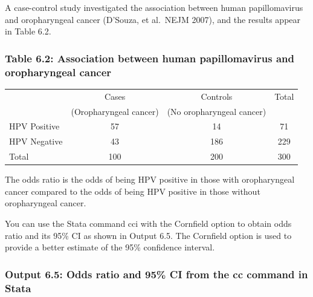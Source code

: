 \documentclass[
]{memoir}
\begin{document}
A case-control study investigated the association between human papillomavirus and oropharyngeal cancer (D'Souza, et al.~NEJM 2007), and the results appear in Table 6.2.

\hypertarget{table-6.2-association-between-human-papillomavirus-and-oropharyngeal-cancer}{%
\subsubsection{Table 6.2: Association between human papillomavirus and oropharyngeal cancer}\label{table-6.2-association-between-human-papillomavirus-and-oropharyngeal-cancer}}

\begin{longtable}[]{@{}lccc@{}}
\toprule
\endhead
& Cases & Controls & Total \\
& (Oropharyngeal cancer) & (No oropharyngeal cancer) & \\
HPV Positive & 57 & 14 & 71 \\
HPV Negative & 43 & 186 & 229 \\
Total & 100 & 200 & 300 \\
\bottomrule
\end{longtable}

The odds ratio is the odds of being HPV positive in those with oropharyngeal cancer compared to the odds of being HPV positive in those without oropharyngeal cancer.

You can use the Stata command cci with the Cornfield option to obtain odds ratio and its 95\% CI as shown in Output 6.5. The Cornfield option is used to provide a better estimate of the 95\% confidence interval.

\hypertarget{output-6.5-odds-ratio-and-95-ci-from-the-cc-command-in-stata}{%
\subsubsection{Output 6.5: Odds ratio and 95\% CI from the cc command in Stata}\label{output-6.5-odds-ratio-and-95-ci-from-the-cc-command-in-stata}}
\end{document}
